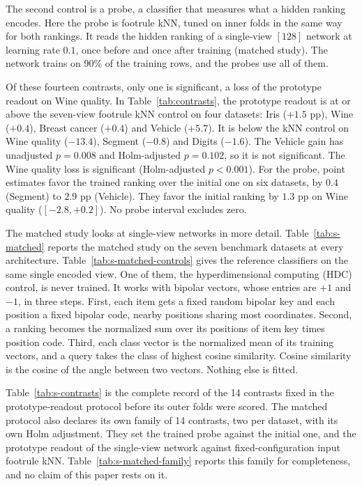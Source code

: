 The second control is a probe, a classifier that measures what a hidden ranking encodes. Here the probe is footrule kNN, tuned on inner folds in the same way for both rankings. It reads the hidden ranking of a single-view $[128]$ network at learning rate $0.1$, once before and once after training (matched study). The network trains on 90\% of the training rows, and the probes use all of them.

Of these fourteen contrasts, only one is significant, a loss of the prototype readout on Wine quality. In Table~\ref{tab:contrasts}, the prototype readout is at or above the seven-view footrule kNN control on four datasets: Iris ($+1.5$ pp), Wine ($+0.4$), Breast cancer ($+0.4$) and Vehicle ($+5.7$). It is below the kNN control on Wine quality ($-13.4$), Segment ($-0.8$) and Digits ($-1.6$). The Vehicle gain has unadjusted $p=0.008$ and Holm-adjusted $p=0.102$, so it is not significant. The Wine quality loss is significant (Holm-adjusted $p<0.001$). For the probe, point estimates favor the trained ranking over the initial one on six datasets, by $0.4$ (Segment) to $2.9$ pp (Vehicle). They favor the initial ranking by $1.3$ pp on Wine quality ($[-2.8,+0.2]$). No probe interval excludes zero.




The matched study looks at single-view networks in more detail. Table~\ref{tab:s-matched} reports the matched study on the seven benchmark datasets at every architecture. Table~\ref{tab:s-matched-controls} gives the reference classifiers on the same single encoded view. One of them, the hyperdimensional computing (HDC) control, is never trained. It works with bipolar vectors, whose entries are $+1$ and $-1$, in three steps. First, each item gets a fixed random bipolar key and each position a fixed bipolar code, nearby positions sharing most coordinates. Second, a ranking becomes the normalized sum over its positions of item key times position code. Third, each class vector is the normalized mean of its training vectors, and a query takes the class of highest cosine similarity. Cosine similarity is the cosine of the angle between two vectors. Nothing else is fitted.

Table~\ref{tab:s-contrasts} is the complete record of the 14 contrasts fixed in the prototype-readout protocol before its outer folds were scored. The matched protocol also declares its own family of 14 contrasts, two per dataset, with its own Holm adjustment. They set the trained probe against the initial one, and the prototype readout of the single-view network against fixed-configuration input footrule kNN. Table~\ref{tab:s-matched-family} reports this family for completeness, and no claim of this paper rests on it.

